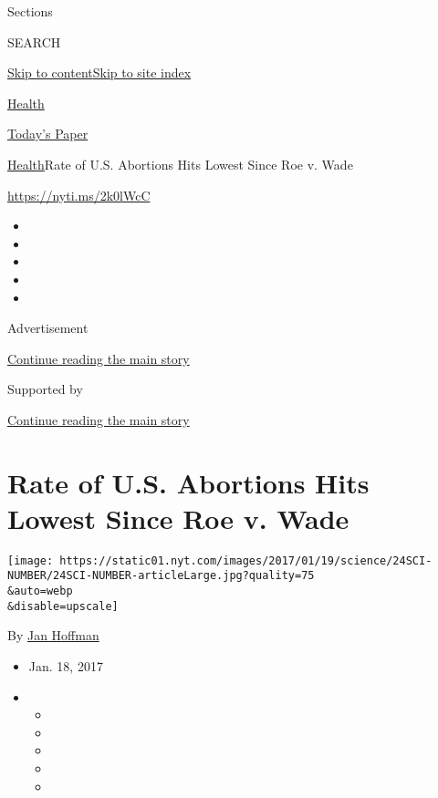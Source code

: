 Sections

SEARCH

\protect\hyperlink{site-content}{Skip to
content}\protect\hyperlink{site-index}{Skip to site index}

\href{https://www.nytimes.com/section/health}{Health}

\href{https://myaccount.nytimes.com/auth/login?response_type=cookie\&client_id=vi}{}

\href{https://www.nytimes.com/section/todayspaper}{Today's Paper}

\href{/section/health}{Health}\textbar{}Rate of U.S. Abortions Hits
Lowest Since Roe v. Wade

\url{https://nyti.ms/2k0lWcC}

\begin{itemize}
\item
\item
\item
\item
\item
\end{itemize}

Advertisement

\protect\hyperlink{after-top}{Continue reading the main story}

Supported by

\protect\hyperlink{after-sponsor}{Continue reading the main story}

\hypertarget{rate-of-us-abortions-hits-lowest-since-roe-v-wade}{%
\section{Rate of U.S. Abortions Hits Lowest Since Roe v.
Wade}\label{rate-of-us-abortions-hits-lowest-since-roe-v-wade}}

\texttt{[image: https://static01.nyt.com/images/2017/01/19/science/24SCI-NUMBER/24SCI-NUMBER-articleLarge.jpg?quality=75\\\&auto=webp\\\&disable=upscale]}

By \href{http://www.nytimes.com/by/jan-hoffman}{Jan Hoffman}

\begin{itemize}
\item
  Jan. 18, 2017
\item
  \begin{itemize}
  \item
  \item
  \item
  \item
  \item
  \end{itemize}
\end{itemize}

